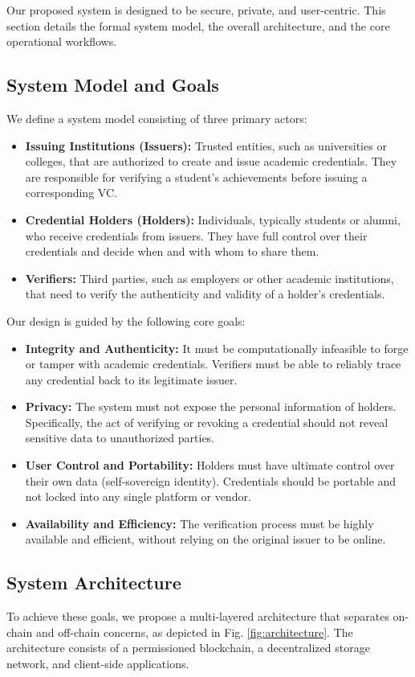 \documentclass[lettersize,journal]{IEEEtran}
\begin{document}
Our proposed system is designed to be secure, private, and user-centric. This section details the formal system model, the overall architecture, and the core operational workflows.

\subsection{System Model and Goals}
We define a system model consisting of three primary actors:
\begin{itemize}
    \item \textbf{Issuing Institutions (Issuers):} Trusted entities, such as universities or colleges, that are authorized to create and issue academic credentials. They are responsible for verifying a student's achievements before issuing a corresponding VC.
    \item \textbf{Credential Holders (Holders):} Individuals, typically students or alumni, who receive credentials from issuers. They have full control over their credentials and decide when and with whom to share them.
    \item \textbf{Verifiers:} Third parties, such as employers or other academic institutions, that need to verify the authenticity and validity of a holder's credentials.
\end{itemize}

Our design is guided by the following core goals:
\begin{itemize}
    \item \textbf{Integrity and Authenticity:} It must be computationally infeasible to forge or tamper with academic credentials. Verifiers must be able to reliably trace any credential back to its legitimate issuer.
    \item \textbf{Privacy:} The system must not expose the personal information of holders. Specifically, the act of verifying or revoking a credential should not reveal sensitive data to unauthorized parties.
    \item \textbf{User Control and Portability:} Holders must have ultimate control over their own data (self-sovereign identity). Credentials should be portable and not locked into any single platform or vendor.
    \item \textbf{Availability and Efficiency:} The verification process must be highly available and efficient, without relying on the original issuer to be online.
\end{itemize}

\subsection{System Architecture}
To achieve these goals, we propose a multi-layered architecture that separates on-chain and off-chain concerns, as depicted in Fig. \ref{fig:architecture}. The architecture consists of a permissioned blockchain, a decentralized storage network, and client-side applications.
\end{document}
